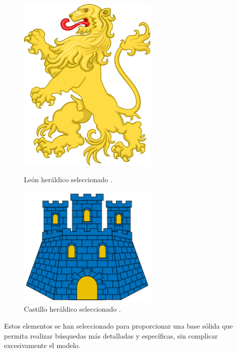 \begin{itemize}
\begin{figure}[h!]
        \begin{minipage}{0.45\textwidth}
            \centering
            \includegraphics[width=0.6\textwidth]{figuras/leon.png}
            \caption{León heráldico seleccionado \cite{leon_wikipedia}.}
        \end{minipage}
        \hfill
        \begin{minipage}{0.45\textwidth}
            \centering
            \includegraphics[width=0.6\textwidth]{figuras/castillo.png}
            \caption{Castillo heráldico seleccionado \cite{castillo_wikipedia}.}
        \end{minipage}
    \end{figure}
\end{itemize}

Estos elementos se han seleccionado para proporcionar una base sólida que permita 
realizar búsquedas más detalladas y específicas, sin complicar excesivamente el modelo.

